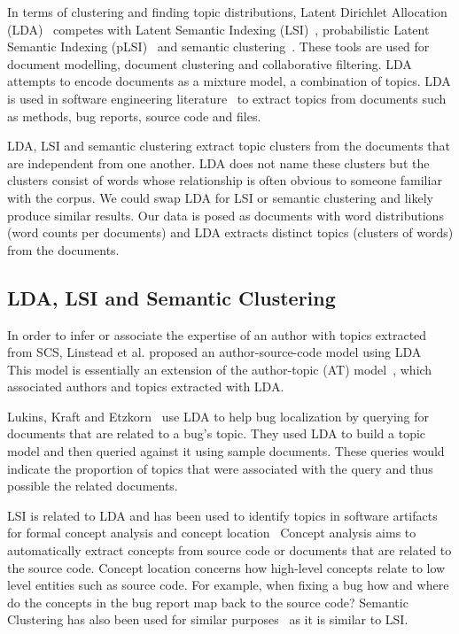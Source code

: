 \documentclass[times, 10pt,twocolumn]{article}
\newcommand{\shrinkit}{\vspace*{-.3em}}
\begin{document}
In terms of clustering and finding topic distributions, Latent
Dirichlet Allocation (LDA)~\cite{944937} competes with Latent Semantic
Indexing
(LSI)~\cite{1374321,10.1109/ICPC.2007.13},
probabilistic Latent Semantic Indexing (pLSI)~\cite{944937} and
semantic clustering~\cite{1698774,1566153}. These tools are used for
document modelling, document clustering and collaborative
filtering. LDA attempts to encode documents as a mixture
model, a combination of topics.  LDA is used in software engineering
literature~\cite{lukins2008,10.1109/MSR.2007.20}%
 to extract topics from documents such as methods, bug
reports, source code and files.

LDA, LSI and semantic clustering extract topic
clusters from the documents that are independent from one another. LDA
does not name these clusters but the clusters consist of words whose
relationship is often obvious to someone familiar with the corpus. We
could swap LDA for LSI or semantic clustering and likely produce similar
results. Our data is posed as documents with word distributions (word
counts per documents) and LDA extracts distinct topics (clusters of
words) from the documents.

\shrinkit
\subsection{LDA, LSI and Semantic Clustering}
\shrinkit

In order to infer or associate the expertise of an author with topics
extracted from SCS, Linstead et al. proposed an author-source-code model
using LDA~\cite{10.1109/MSR.2007.20}%
This model
is essentially an extension of the author-topic (AT)
model~\cite{1036902}, which associated authors and topics extracted
with LDA.

Lukins, Kraft and Etzkorn~\cite{lukins2008} use LDA to help bug
localization by querying for documents that are related to a bug's topic. They
used LDA to build a topic model and then queried against it using
sample documents. These queries would indicate the proportion of
topics that were associated with the query and thus possible the
related documents.

LSI is related to LDA and has been used to identify topics in software
artifacts for formal concept analysis and concept
location~\cite{1374321,10.1109/ICPC.2007.13}
Concept analysis aims to automatically extract concepts from source
code or documents that are related to the source code.  Concept location concerns how
high-level concepts relate to low level entities such as source code. For
example, when fixing a bug how and where do the concepts in the bug
report map back to the source code?  Semantic Clustering has also been
used for similar purposes~\cite{1698774,1566153} as it is similar to
LSI.
\end{document}
